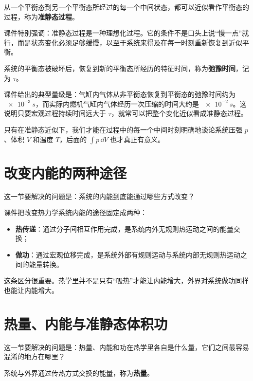 \documentclass[lang=cn,11pt]{elegantbook}
\newcommand{\bridge}[1]{\begin{note}#1\end{note}}
\begin{document}
\begin{definition}[准静态过程]
从一个平衡态到另一个平衡态所经过的每一个中间状态，都可以近似看作平衡态的过程，称为\textbf{准静态过程}。
\end{definition}

课件特别强调：准静态过程是一种理想化过程。它的条件不是口头上说“慢一点”就行，而是状态变化必须足够缓慢，以至于系统来得及在每一时刻重新恢复到近似平衡。

\begin{definition}[弛豫时间]
系统的平衡态被破坏后，恢复到新的平衡态所经历的特征时间，称为\textbf{弛豫时间}，记为 \(\tau\)。
\end{definition}

\begin{note}
课件给出的典型量级是：气缸内气体从非平衡态恢复到平衡态的弛豫时间约为 \(\SI{e-3}{s}\)，而实际内燃机气缸内气体经历一次压缩的时间大约是 \(\SI{e-2}{s}\)。这说明只要宏观过程持续时间远大于 \(\tau\)，就常可以把整个变化近似看成准静态过程。
\end{note}

\bridge{只有在准静态近似下，我们才能在过程中的每一个中间时刻明确地谈论系统压强 \(p\)、体积 \(V\) 和温度 \(T\)，后面的 \(\int p\,\dd V\) 也才真正有意义。}

\section{改变内能的两种途径}

这一节要解决的问题是：系统的内能到底能通过哪些方式改变？

课件把改变热力学系统内能的途径固定成两种：
\begin{itemize}
  \item \textbf{热传递}：通过分子间相互作用完成，是系统内外无规则热运动之间的能量交换；
  \item \textbf{做功}：通过宏观位移完成，是系统外部有规则运动与系统内部无规则热运动之间的能量转换。
\end{itemize}

这条区分很重要。热学里并不是只有“吸热”才能让内能增大，外界对系统做功同样也能让内能增大。

\section{热量、内能与准静态体积功}

这一节要解决的问题是：热量、内能和功在热学里各自是什么量，它们之间最容易混淆的地方在哪里？

\begin{definition}[热量]\label{def:heat}
系统与外界通过传热方式交换的能量，称为\textbf{热量}。
\end{definition}
\end{document}
